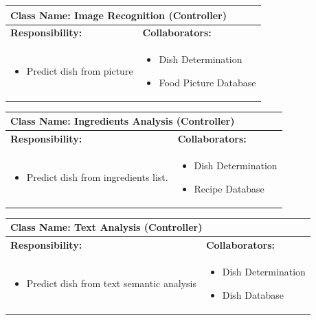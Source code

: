 \documentclass[]{article}
\begin{document}
\begin{table}[H]
	\centering
	\begin{tabular}{|p{7cm}|p{7cm}|}
	\hline 
	 \multicolumn{2}{|l|}{\textbf{Class Name: Image Recognition (Controller)}} \\
	\hline
	\textbf{Responsibility:} & \textbf{Collaborators:} \\
	\hline
	\raggedright
	\begin{itemize}
		\item Predict dish from picture
	\end{itemize}
	\vspace{1in} & 
	\begin{itemize}
		\item Dish Determination
		\item Food Picture Database
	\end{itemize} \\
	\hline
	\end{tabular}
\end{table}

\begin{table}[H]
	\centering
	\begin{tabular}{|p{7cm}|p{7cm}|}
	\hline 
	 \multicolumn{2}{|l|}{\textbf{Class Name: Ingredients Analysis (Controller)}} \\
	\hline
	\textbf{Responsibility:} & \textbf{Collaborators:} \\
	\hline
	\raggedright
	\begin{itemize}
		\item Predict dish from ingredients list.
	\end{itemize}
	\vspace{1in} & 
	\begin{itemize}
		\item Dish Determination
		\item Recipe Database
	\end{itemize} \\
	\hline
	\end{tabular}
\end{table}

\begin{table}[H]
	\centering
	\begin{tabular}{|p{7cm}|p{7cm}|}
	\hline 
	 \multicolumn{2}{|l|}{\textbf{Class Name: Text Analysis (Controller)}} \\
	\hline
	\textbf{Responsibility:} & \textbf{Collaborators:} \\
	\hline
	\raggedright
	\begin{itemize}
		\item Predict dish from text semantic analysis
	\end{itemize}
	\vspace{1in} & 
	\begin{itemize}
		\item Dish Determination
		\item Dish Database
	\end{itemize} \\
	\hline
	\end{tabular}
\end{table}
\end{document}
